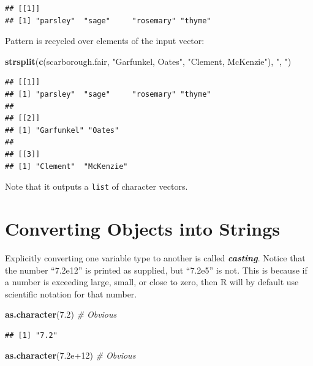\documentclass[
]{book}
\newenvironment{Shaded}{\begin{snugshade}}{\end{snugshade}}
\newcommand{\CommentTok}[1]{\textcolor[rgb]{0.56,0.35,0.01}{\textit{#1}}}
\newcommand{\FloatTok}[1]{\textcolor[rgb]{0.00,0.00,0.81}{#1}}
\newcommand{\KeywordTok}[1]{\textcolor[rgb]{0.13,0.29,0.53}{\textbf{#1}}}
\newcommand{\NormalTok}[1]{#1}
\newcommand{\StringTok}[1]{\textcolor[rgb]{0.31,0.60,0.02}{#1}}
\begin{document}
\begin{verbatim}
## [[1]]
## [1] "parsley"  "sage"     "rosemary" "thyme"
\end{verbatim}

Pattern is recycled over elements of the input vector:

\begin{Shaded}
\begin{Highlighting}[]
\KeywordTok{strsplit}\NormalTok{(}\KeywordTok{c}\NormalTok{(scarborough.fair, }\StringTok{"Garfunkel, Oates"}\NormalTok{, }\StringTok{"Clement, McKenzie"}\NormalTok{),}
    \StringTok{", "}\NormalTok{)}
\end{Highlighting}
\end{Shaded}

\begin{verbatim}
## [[1]]
## [1] "parsley"  "sage"     "rosemary" "thyme"   
## 
## [[2]]
## [1] "Garfunkel" "Oates"    
## 
## [[3]]
## [1] "Clement"  "McKenzie"
\end{verbatim}

Note that it outputs a \texttt{list} of character vectors.

\hypertarget{converting-objects-into-strings}{%
\section{Converting Objects into Strings}\label{converting-objects-into-strings}}

Explicitly converting one variable type to another is called \textbf{\emph{casting}}. Notice that the number ``7.2e12'' is printed as supplied, but ``7.2e5'' is not. This is because if a number is exceeding large, small, or close to zero, then R will by default use scientific notation for that number.

\begin{Shaded}
\begin{Highlighting}[]
\KeywordTok{as.character}\NormalTok{(}\FloatTok{7.2}\NormalTok{)  }\CommentTok{# Obvious}
\end{Highlighting}
\end{Shaded}

\begin{verbatim}
## [1] "7.2"
\end{verbatim}

\begin{Shaded}
\begin{Highlighting}[]
\KeywordTok{as.character}\NormalTok{(}\FloatTok{7.2e+12}\NormalTok{)  }\CommentTok{# Obvious}
\end{Highlighting}
\end{Shaded}
\end{document}
